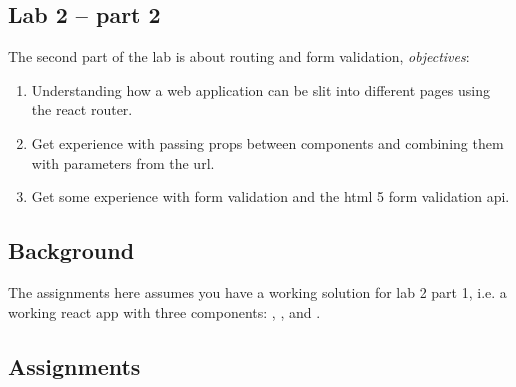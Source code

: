 \documentclass[fleqn, article, a4paper]{memoir}
\begin{document}
\maketitle
\thispagestyle{titlepage}
\vspace{-4cm}

\subsection*{Lab 2 -- part 2}

\n The second part of the lab is about routing and form validation, \emph{objectives}:

\begin{enumerate}\firmlist
\item Understanding how a web application can be slit into different pages using the react router.
\item Get experience with passing props between components and combining them with parameters from the url.
\item Get some experience with form validation and the html 5 form validation api.
\end{enumerate}

\subsection*{Background}

The assignments here assumes you have a working solution for lab 2 part 1, i.e. a working react app with three components: , , and .

\subsection*{Assignments}
\end{document}
